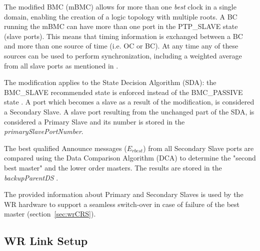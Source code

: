  
The modified BMC (mBMC) allows for more than one \textit{best} clock in a single domain, 
enabling the creation of a logic topology with multiple roots. A BC 
running the mBMC can have more than one port in the PTP\_SLAVE state (slave ports). 
This means that timing information is exchanged between a BC and 
more than one source of time (i.e. OC or BC). At any time 
any of these sources can be used to perform synchronization, including a weighted 
average from all slave ports as mentioned in \cite{biblio:Takahide}.

The modification applies to the State Decision Algorithm (SDA): the BMC\_SLAVE 
recommended state is enforced instead of the BMC\_PASSIVE state 
. A port
which becomes a slave as a result of the modification, is considered
a Secondary Slave. A slave port resulting from the unchanged part of the SDA,
is considered a Primary Slave and its number is stored in the \textit{primarySlavePortNumber}. 

The best qualified Announce messages ($E_{rbest}$) 
from all Secondary Slave ports are compared using the Data Comparison Algorithm (DCA) 
to determine the "second best master" and the lower order masters. The results 
are stored in the \textit{backupParentDS} .

The provided information about Primary and Secondary Slaves is used by the WR hardware
to support a seamless switch-over in case of failure of the best master 
(section~\ref{sec:wrCRS}). 

\subsection{WR Link Setup}
\label{sec:wrLinkSetup}

